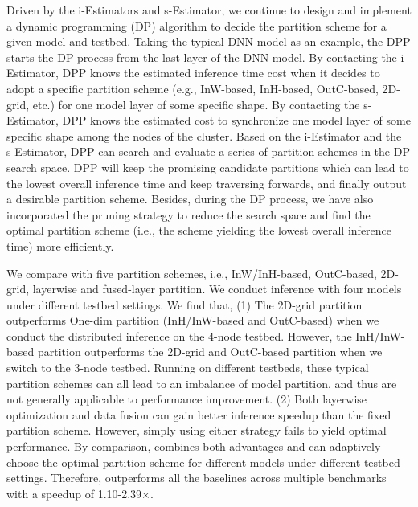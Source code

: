  Driven by the i-Estimators and s-Estimator, we continue to design and implement a dynamic programming (DP) algorithm to decide the partition scheme for a given model and testbed. Taking the typical DNN model as an example, the DPP starts the DP process from the last layer of the DNN model. By contacting the i-Estimator, DPP knows the estimated inference time cost when it decides to adopt a specific partition scheme (e.g., InW-based, InH-based, OutC-based, 2D-grid, etc.) for one model layer of some specific shape. By contacting the s-Estimator, DPP knows the estimated cost to synchronize one model layer of some specific shape among the nodes of the cluster. Based on the i-Estimator and the s-Estimator, DPP can search and evaluate a series of partition schemes in the DP search space.  DPP will keep the promising candidate partitions which can lead to the lowest overall inference time and keep traversing forwards, and finally output a desirable partition scheme. Besides, during the DP process, we have also incorporated the pruning strategy to reduce the search space and find the optimal partition scheme (i.e., the scheme yielding the lowest overall inference time) more efficiently.

 We compare \sysname with five partition schemes, i.e., InW/InH-based, OutC-based, 2D-grid, layerwise and fused-layer partition. We conduct inference with four models under different testbed settings. We find that, (1) The 2D-grid partition outperforms One-dim partition (InH/InW-based and OutC-based) when we conduct the distributed inference on the 4-node testbed. However, the InH/InW-based partition outperforms the 2D-grid and OutC-based partition when we switch to the 3-node testbed. Running on different testbeds, these typical partition schemes can all lead to an imbalance of model partition, and thus are not generally applicable to performance improvement. (2) Both layerwise optimization and data fusion can gain better inference speedup than the fixed partition scheme. However, simply using either strategy fails to yield optimal performance. By comparison, \sysname combines both advantages and can adaptively choose the optimal partition scheme for different models under different testbed settings. Therefore, \sysname outperforms all the baselines across multiple benchmarks with a speedup of 1.10-2.39$\times$.

